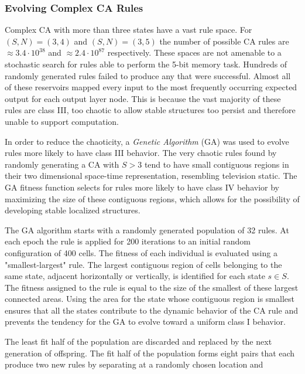\documentclass{elsarticle}
\begin{document}
\begin{multicols}{2}
	\subsubsection{Evolving Complex CA Rules}
	Complex CA with more than three states have a vast rule space. For $(S,N) = 
	(3,4)$ and $(S,N) = (3,5)$ the number of possible CA rules are $\approx 3.4 
	\cdot 10^{38}$ and $\approx 2.4 \cdot 10^{87}$ respectively. These spaces 
	are not amenable to a stochastic search for rules able to perform the 5-bit 
	memory task.  Hundreds of randomly generated rules failed to produce any 
	that were successful. Almost all of these reservoirs mapped every input to 
	the most frequently occurring expected output for each output layer node.  
	This is because the vast majority of these rules are class III, too chaotic 
	to allow stable structures too persist and therefore unable to support 
	computation.\par
	In order to reduce the chaoticity, a \textit{Genetic Algorithm} (GA) 
	\cite{mitchell1996evolving} was used to evolve rules more likely to have class 
	III behavior. The very chaotic rules found by randomly generating a CA with $S 
	> 3$ tend to have small contiguous regions in their two dimensional space-time 
	representation, resembling television static.  The GA fitness function selects 
	for rules more likely to have class IV behavior by maximizing the size of these 
	contiguous regions, which allows for the possibility of developing stable 
	localized structures. \par The GA algorithm starts with a randomly 
	generated population of 32 rules. At each epoch the rule is applied for 
	200 iterations to an initial random configuration of 400 cells.  The 
	fitness of each individual is evaluated using a "smallest-largest" rule.  
	The largest contiguous region of cells belonging to the same state, 
	adjacent horizontally or vertically, is identified for each state $s 
	\in S$. The fitness assigned to the rule is equal to the size of 
	the smallest of these largest connected areas. Using the area for 
	the state whose contiguous region is smallest ensures that all the 
	states contribute to the dynamic behavior of the CA rule and 
	prevents the tendency for the GA to evolve toward a uniform class 
	I behavior.  \par The least fit half of the population are 
	discarded and replaced by the next generation of offspring.  The 
	fit half of the population forms eight pairs that each produce two 
	new rules by separating at a randomly chosen location and 

\end{multicols}
\end{document}
